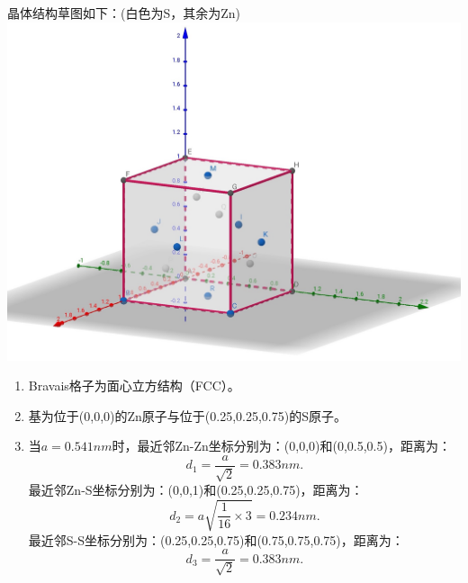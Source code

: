 \documentclass[reqno,a4paper,12pt]{amsart}
\begin{document}
\begin{tcolorbox}[breakable, colback = black!5!white, colframe = black]
晶体结构草图如下：(白色为S，其余为Zn)\\
\includegraphics[scale = 0.16]{12.3structure.jpeg}
\begin{enumerate}[itemindent = -1.2em]
\item Bravais格子为面心立方结构（FCC）。 

\item 基为位于(0,0,0)的Zn原子与位于(0.25,0.25,0.75)的S原子。

\item 当$a = 0.541nm$时，最近邻Zn-Zn坐标分别为：(0,0,0)和(0,0.5,0.5)，距离为：
\[
	d_1 = \frac{a}{\sqrt{2}} = 0.383nm.
\]
最近邻Zn-S坐标分别为：(0,0,1)和(0.25,0.25,0.75)，距离为：
\[
	d_2 = a\sqrt{\frac{1}{16}\times 3} = 0.234nm.
\]
最近邻S-S坐标分别为：(0.25,0.25,0.75)和(0.75,0.75,0.75)，距离为：
\[
	d_3 = \frac{a}{\sqrt{2}} = 0.383nm.
\]
\end{enumerate}
\end{tcolorbox}
\end{document}
